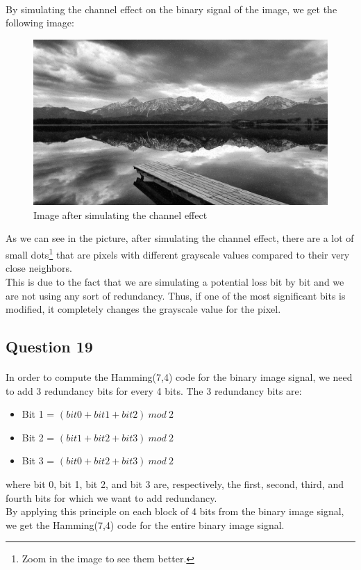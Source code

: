 \documentclass[a4paper, 11pt, oneside]{article}
\begin{document}
\paragraph{}By simulating the channel effect on the binary signal of the image, we get the following image:
\begin{figure}[H]
    \centering
    \includegraphics[scale=0.2]{q18.png}
    \caption{Image after simulating the channel effect}
\end{figure}
As we can see in the picture, after simulating the channel effect, there are a lot of small dots\footnote{Zoom in the image to see them better.} that are pixels with different grayscale values
compared to their very close neighbors.\\
This is due to the fact that we are simulating a potential loss bit by bit and we are not using any sort of redundancy.
Thus, if one of the most significant bits is modified, it completely changes the grayscale value for the pixel.


\subsection{Question 19}
\paragraph{}In order to compute the Hamming(7,4) code for the binary image signal, we need to add 3 redundancy bits for every 4 bits. The 3 redundancy bits are:
\begin{itemize}
    \item Bit 1 = $(bit 0 + bit 1 + bit 2) \ mod \ 2$
    \item Bit 2 = $(bit 1 + bit 2 + bit 3) \ mod \ 2$
    \item Bit 3 = $(bit 0 + bit 2 + bit 3) \ mod \ 2$
\end{itemize}
where bit 0, bit 1, bit 2, and bit 3 are, respectively, the first, second, third, and fourth bits for which we want to add redundancy.\\
By applying this principle on each block of 4 bits from the binary image signal, we get the Hamming(7,4) code for the entire binary image signal.

\end{document}
